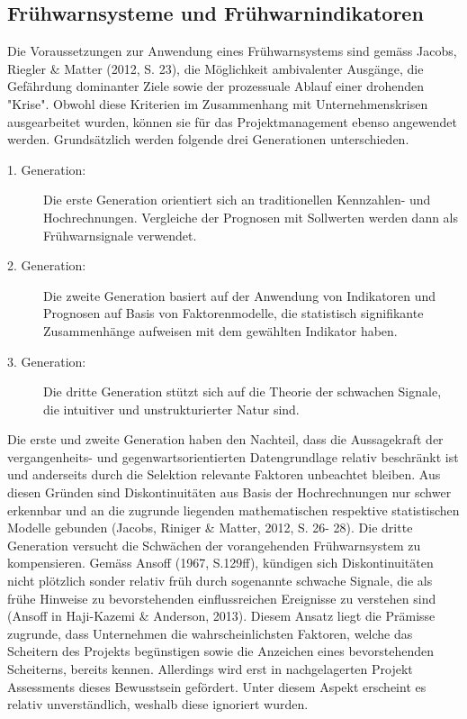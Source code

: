 \subsection{Frühwarnsysteme und Frühwarnindikatoren}\label{viereins}
Die Voraussetzungen zur Anwendung eines Frühwarnsystems sind gemäss Jacobs, Riegler \& Matter (2012, S. 23), die Möglichkeit ambivalenter Ausgänge, die Gefährdung dominanter Ziele sowie der prozessuale Ablauf einer drohenden "Krise". Obwohl diese Kriterien im Zusammenhang mit Unternehmenskrisen ausgearbeitet wurden, können sie für das Projektmanagement ebenso angewendet werden. Grundsätzlich werden folgende drei Generationen unterschieden.
\begin{description}
	\item[1. Generation:] Die erste Generation orientiert sich an traditionellen Kennzahlen- und Hochrechnungen. Vergleiche der Prognosen mit Sollwerten werden dann als Frühwarnsignale verwendet.
	\item[2. Generation:] Die zweite Generation basiert auf der Anwendung von Indikatoren und Prognosen auf Basis von Faktorenmodelle, die statistisch signifikante Zusammenhänge aufweisen mit dem gewählten Indikator haben.
	\item[3. Generation:] Die dritte Generation stützt sich auf die Theorie der schwachen Signale, die intuitiver und unstrukturierter Natur sind. 
\end{description}
Die erste und zweite Generation haben den Nachteil, dass die Aussagekraft der vergangenheits- und gegenwartsorientierten Datengrundlage relativ beschränkt ist und anderseits durch die Selektion relevante Faktoren unbeachtet bleiben. Aus diesen Gründen sind Diskontinuitäten aus Basis der Hochrechnungen nur schwer erkennbar und an die zugrunde liegenden mathematischen respektive statistischen Modelle gebunden   (Jacobs, Riniger \& Matter, 2012, S. 26- 28). Die dritte Generation versucht die Schwächen der vorangehenden Frühwarnsystem zu kompensieren. Gemäss Ansoff (1967, S.129ff), kündigen sich Diskontinuitäten nicht plötzlich sonder relativ früh durch sogenannte schwache Signale, die als frühe Hinweise zu bevorstehenden einflussreichen Ereignisse zu verstehen sind (Ansoff in Haji-Kazemi \& Anderson, 2013). Diesem Ansatz liegt die Prämisse zugrunde, dass Unternehmen die wahrscheinlichsten Faktoren, welche das Scheitern des Projekts begünstigen sowie die Anzeichen eines bevorstehenden Scheiterns, bereits kennen. Allerdings wird erst in nachgelagerten Projekt Assessments dieses Bewusstsein gefördert. Unter diesem Aspekt erscheint es relativ unverständlich, weshalb diese ignoriert wurden.
